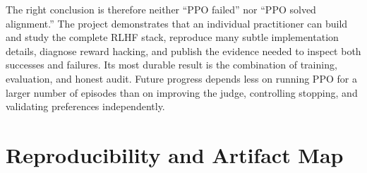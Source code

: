 \documentclass[11pt]{article}
\begin{document}
The right conclusion is therefore neither ``PPO failed'' nor ``PPO solved
alignment.'' The project demonstrates that an individual practitioner can
build and study the complete RLHF stack, reproduce many subtle implementation
details, diagnose reward hacking, and publish the evidence needed to inspect
both successes and failures. Its most durable result is the combination of
training, evaluation, and honest audit. Future progress depends less on
running PPO for a larger number of episodes than on improving the judge,
controlling stopping, and validating preferences independently.

\appendix

\section{Reproducibility and Artifact Map}
\end{document}
